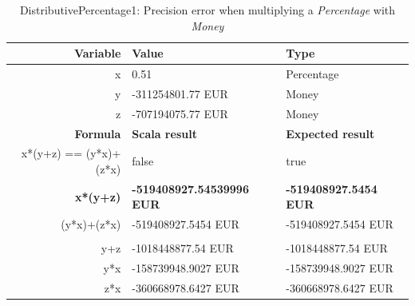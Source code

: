 \begin{table}[!ht]
\centering
\begin{tabular}{rll}
\hline
\textbf{Variable}      & \textbf{Value}                   & \textbf{Type}                \\ \hline
x                      & 0.51                             & Percentage                   \\
y                      & -311254801.77 EUR                & Money                        \\
z                      & -707194075.77 EUR                & Money                        \\ \hline
\textbf{Formula}       & \textbf{Scala result}            & \textbf{Expected result}     \\ \hline
x*(y+z) == (y*x)+(z*x) & false                            & true                         \\
\textbf{x*(y+z)}       & \textbf{-519408927.54539996 EUR} & \textbf{-519408927.5454 EUR} \\
(y*x)+(z*x)            & -519408927.5454 EUR              & -519408927.5454 EUR          \\
                       &                                  &                              \\
y+z                    & -1018448877.54 EUR               & -1018448877.54 EUR           \\
y*x                    & -158739948.9027 EUR              & -158739948.9027 EUR          \\
z*x                    & -360668978.6427 EUR              & -360668978.6427 EUR          \\ \hline
\end{tabular}
\caption{DistributivePercentage1: Precision error when multiplying a \textit{Percentage} with \textit{Money}}
\label{ch4_init_check_DistributivePercentage1}
\end{table}
\FloatBarrier\noindent
\clearpage %
